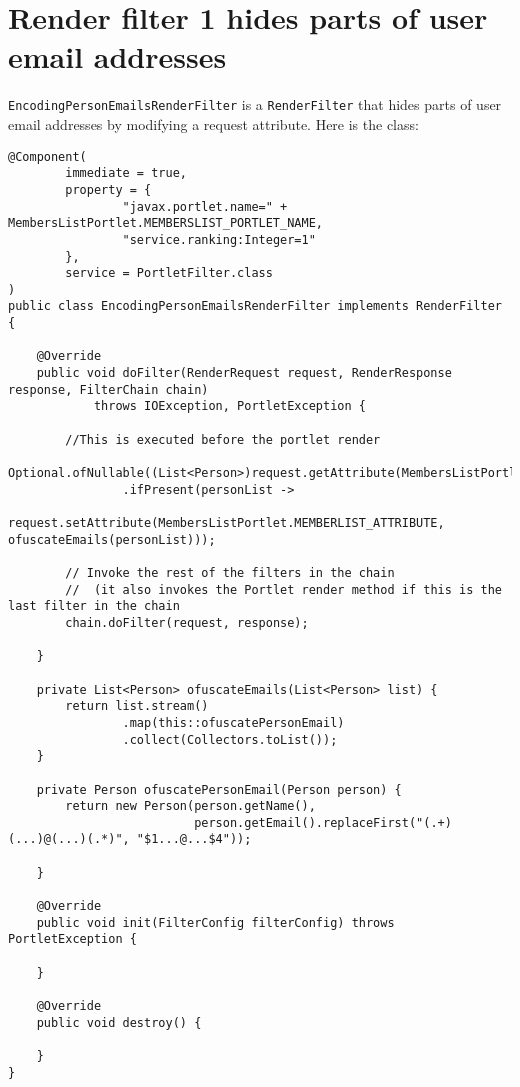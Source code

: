 \section{Render filter 1 hides parts of user email
addresses}\label{render-filter-1-hides-parts-of-user-email-addresses}

\texttt{EncodingPersonEmailsRenderFilter} is a \texttt{RenderFilter}
that hides parts of user email addresses by modifying a request
attribute. Here is the class:

\begin{verbatim}
@Component(
        immediate = true,
        property = {
                "javax.portlet.name=" + MembersListPortlet.MEMBERSLIST_PORTLET_NAME,
                "service.ranking:Integer=1" 
        },
        service = PortletFilter.class
)
public class EncodingPersonEmailsRenderFilter implements RenderFilter {

    @Override
    public void doFilter(RenderRequest request, RenderResponse response, FilterChain chain)
            throws IOException, PortletException {

        //This is executed before the portlet render
        Optional.ofNullable((List<Person>)request.getAttribute(MembersListPortlet.MEMBERLIST_ATTRIBUTE))
                .ifPresent(personList ->
                        request.setAttribute(MembersListPortlet.MEMBERLIST_ATTRIBUTE, ofuscateEmails(personList)));

        // Invoke the rest of the filters in the chain
        //  (it also invokes the Portlet render method if this is the last filter in the chain
        chain.doFilter(request, response);

    }

    private List<Person> ofuscateEmails(List<Person> list) {
        return list.stream()
                .map(this::ofuscatePersonEmail)
                .collect(Collectors.toList());
    }

    private Person ofuscatePersonEmail(Person person) {
        return new Person(person.getName(),
                          person.getEmail().replaceFirst("(.+)(...)@(...)(.*)", "$1...@...$4"));

    }

    @Override
    public void init(FilterConfig filterConfig) throws PortletException {

    }

    @Override
    public void destroy() {

    }
}
\end{verbatim}

